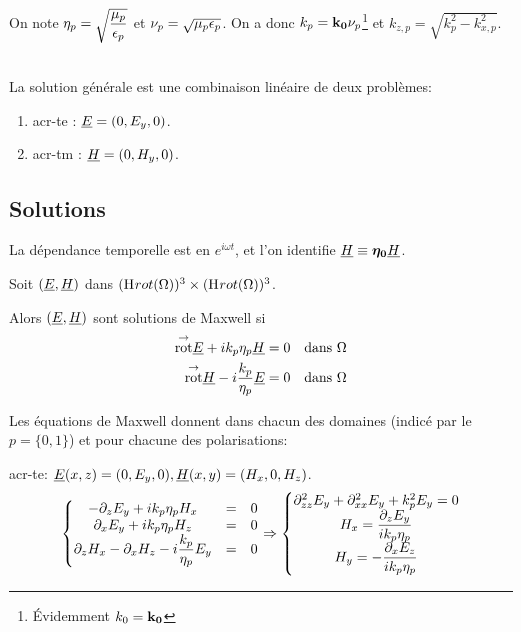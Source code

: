 On note $\eta_p = \sqrt{\dfrac{\mu_p}{\epsilon_p}}$ et $\nu_p = \sqrt{\mu_p \epsilon_p}$.
On a donc $k_p = \mathbf{k_0}\nu_p$\footnote{Évidemment $k_0 = \mathbf{k_0}$} et $k_{z,p} = \sqrt{k_p^2 - k_{x,p}^2}$.

\begin{hyp}{}~\\
La solution générale est une combinaison linéaire de deux problèmes: 
\begin{enumerate}
    \item \gls{acr-te} : $\underline{E} = (0,E_y,0)$.
    \item \gls{acr-tm} : $\underline{H} = (0,H_y,0)$. 
\end{enumerate}
\end{hyp}

\subsection{Solutions}

\begin{tcolorbox}
\centering
La dépendance temporelle est en $e^{i \omega t}$, et l'on identifie $\underline{H} \equiv \boldsymbol{\eta_0} \underline{H}$.
\end{tcolorbox}


Soit $(\underline{E},\underline{H})$ dans $(\mathrm{H}_\mathrm{{}}{rot}(\Omega))^3 \times (\mathrm{H}_\mathrm{{}}{rot}(\Omega))^3$. 

Alors $(\underline{E},\underline{H})$ sont solutions de Maxwell si 
\begin{align}
\label{eq:coeffs_ref:maxwell-E}
{{\overset{\rightarrow}{\operatorname{rot}}}} \underline{E} + i k_p \eta_p \underline{H} &= 0 && \text{dans $\Omega$}\\
\label{eq:coeffs_ref:maxwell-H}
{{\overset{\rightarrow}{\operatorname{rot}}}} \underline{H} - i \dfrac{k_p}{\eta_p} \underline{E} &= 0 && \text{dans $\Omega$}
\end{align}

Les équations de Maxwell donnent dans chacun des domaines (indicé par le $p = \lbrace0,1\rbrace$) et pour chacune des polarisations:

\Gls{acr-te}: $ \underline{E}({x},{z}) = (0,E_y,0), \underline{H}({x},{y}) = (H_x,0,H_z)$. 
\[
\left\lbrace 
\begin{matrix}
-\partial_{{z}} E_{y} + i k_p \eta_p H_{x} & = & 0 \\
\partial_{{x}} E_{y} + i k_p \eta_p H_{z} &= & 0 \\
\partial_{{z}} H_{x}- \partial_{{x}} H_{z} - i\dfrac{k_p}{\eta_p} E_{y} & = & 0\\
\end{matrix}
\right.
\Rightarrow
\left\lbrace
\begin{matrix}
\partial_{{z}{z}}^2 E_{y} + \partial_{{x}{x}}^2 E_{y} + k_p^2 E_{y} = 0\\
H_{x} = \dfrac{\partial_{{z}} E_{y}}{i k_p \eta_p }\\
H_{y} =  -\dfrac{\partial_{{x}} E_{z}}{i k_p \eta_p }
\end{matrix}
\right.
\]

